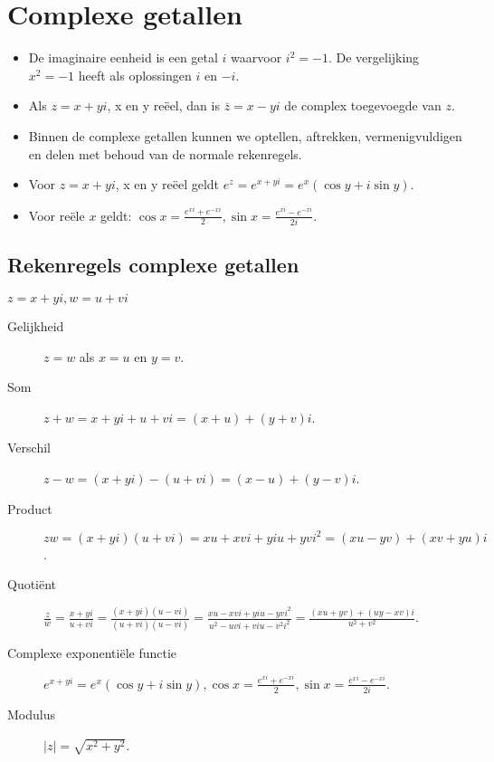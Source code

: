 \section{Complexe getallen}

\begin{itemize}
	\item De imaginaire eenheid is een getal $i$ waarvoor $i^2=-1$. De vergelijking $x^2 = -1$ heeft als oplossingen $i$ en $-i$.
	\item Als $z = x + yi$, x en y re\"eel, dan is $\overline{z} = x -yi$ de complex toegevoegde van $z$.
	\item Binnen de complexe getallen kunnen we optellen, aftrekken, vermenigvuldigen en delen met behoud van de normale rekenregels.
	\item Voor $z = x+yi$, x en y re\"eel geldt $e^z = e^{x+yi} = e^x (\cos y + i \sin y)$.
	\item Voor re\"ele $x$ geldt: $\displaystyle \cos x = \frac{e^{xi} + e^{-xi}}{2}, \sin x = \frac{e^{xi} - e^{-xi}}{2i}$.
\end{itemize}

\subsection{Rekenregels complexe getallen}
$z=x+yi, w=u+vi$
\begin{description}
	\item[Gelijkheid] $z=w$ als $x=u$ en $y=v$.
	\item[Som] $z+w = x+yi + u+vi = (x+u) + (y+v)i$.
	\item[Verschil] $z-w = (x+yi) - (u+vi) = (x-u) + (y-v)i$.
	\item[Product] $zw = (x+yi)(u+vi) = xu + xvi + yiu + yvi^2 = (xu-yv)+(xv+yu)i$.
	\item[Quoti\"ent] $ \displaystyle \frac{z}{w} = \frac{x+yi}{u+vi} = \frac{(x+yi)(u-vi)}{(u+vi)(u-vi)} = \frac{xu-xvi+yiu-yvi^2}{u^2-uvi+viu-v^2i^2} = \frac{(xu+yv)+(uy-xv)i}{u^2+v^2}$.

	\item[Complexe exponenti\"ele functie]
	$\displaystyle e^{x + yi} = e^x(\cos y + i \sin y), \cos x = \frac{e^{xi} + e^{-xi}}{2}, \sin x = \frac{e^{xi} - e^{-xi}}{2i}$.
	\item[Modulus] $|z| = \sqrt{x^2 + y^2}$.
\end{description}

